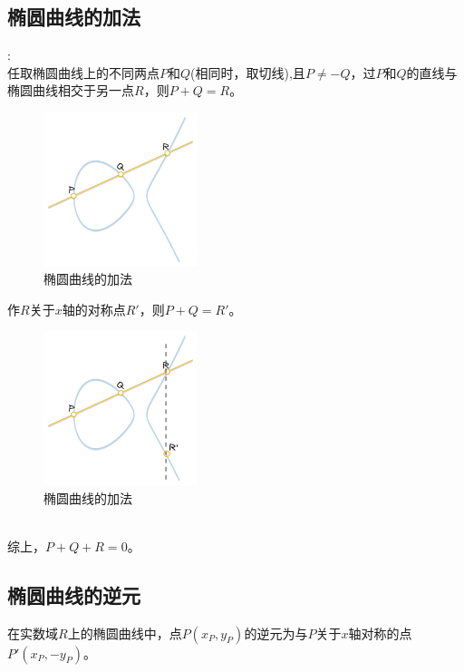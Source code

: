 \documentclass[a4paper]{article}
\begin{document}
\subsection{椭圆曲线的加法}:
\\
任取椭圆曲线上的不同两点$P$和$Q$(相同时，取切线),且$P\not =-Q$，过$P$和$Q$的直线与椭圆曲线相交于另一点$R$，则$P+Q=R$。\\


\begin{figure}[htbp]
    \centering
    \includegraphics[width=0.4\textwidth]{ECC_add_01.png}
    \caption{椭圆曲线的加法}
    \label{fig:1}

\end{figure}
作$R$关于$x$轴的对称点$R'$，则$P+Q=R'$。\\
\begin{figure}[htbp]
    \centering
    \includegraphics[width=0.4\textwidth]{ECC_add_02.png}
    \caption{椭圆曲线的加法}
    \label{fig:2}
    
\end{figure}
\\
\indent 综上，$P+Q+R=0$。\\
\subsection{椭圆曲线的逆元}
在实数域$R$上的椭圆曲线中，点$P(x_{P},y_{P})$的逆元为与$P$关于$x$轴对称的点$P'(x_{P},-y_{P})$。\\
\\
\end{document}
